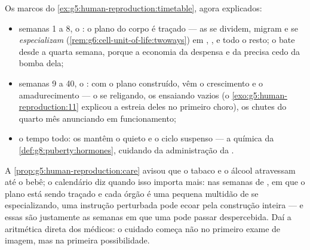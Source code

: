 \begin{proposition}\label{prop:g8:from-egg-to-birth:timetable}
Os marcos do \cref{ex:g5:human-reproduction:timetable}, agora
explicados:
\begin{itemize}
  \item semanas 1 a 8, o \emph{}: o plano do corpo é traçado
        --- as  se dividem, migram e se \emph{especializam}
        (\cref{rem:g6:cell-unit-of-life:twoways}) em , ,
         e todo o resto; o  bate desde a quarta semana,
        porque a economia da despensa e da  precisa cedo da
        bomba dela;
  \item semanas 9 a 40, o \emph{}: com o plano construído, vêm o
        crescimento e o amadurecimento --- o  se religando, os
         ensaiando vazios
        (o \cref{exo:g5:human-reproduction:11} explicou a estreia
        deles no primeiro choro), os chutes do quarto mês anunciando
         em funcionamento;
  \item o tempo todo: os  mantêm o  quieto e o ciclo
        suspenso --- a química da
        \cref{def:g8:puberty:hormones}, cuidando da administração da
        .
\end{itemize}
\end{proposition}
\admitted

\begin{example}\label{ex:g8:from-egg-to-birth:earlycare}
A \cref{prop:g5:human-reproduction:care} avisou que o tabaco e o
álcool atravessam até o bebê; o calendário diz quando isso importa
mais: nas semanas de , em que o plano está sendo traçado e cada
órgão é uma pequena multidão de  se especializando, uma
instrução perturbada pode ecoar pela construção inteira --- e essas são
justamente as semanas em que uma  pode passar despercebida.
Daí a aritmética direta dos médicos: o cuidado começa não no primeiro
exame de imagem, mas na primeira possibilidade.
\end{example}

